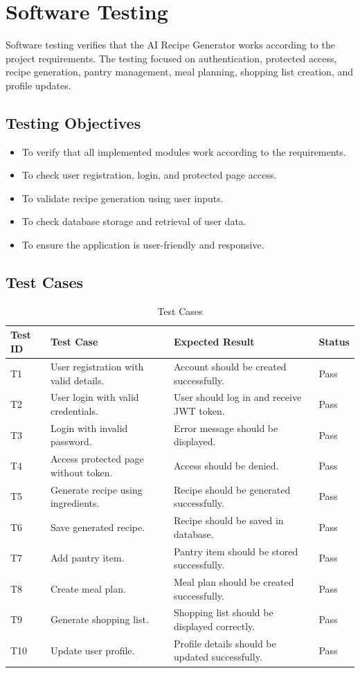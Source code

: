 \section{Software Testing}

Software testing verifies that the AI Recipe Generator works according to the project requirements. The testing focused on authentication, protected access, recipe generation, pantry management, meal planning, shopping list creation, and profile updates.

\subsection{Testing Objectives}
\begin{itemize}
\item To verify that all implemented modules work according to the requirements.
\item To check user registration, login, and protected page access.
\item To validate recipe generation using user inputs.
\item To check database storage and retrieval of user data.
\item To ensure the application is user-friendly and responsive.
\end{itemize}

\subsection{Test Cases}
\begin{table}[h]
\centering
\caption{Test Cases}
\begin{tabularx}{\textwidth}{|p{1.5cm}|X|X|p{2cm}|}
\hline
\textbf{Test ID} & \textbf{Test Case} & \textbf{Expected Result} & \textbf{Status} \\
\hline
T1 & User registration with valid details. & Account should be created successfully. & Pass \\
\hline
T2 & User login with valid credentials. & User should log in and receive JWT token. & Pass \\
\hline
T3 & Login with invalid password. & Error message should be displayed. & Pass \\
\hline
T4 & Access protected page without token. & Access should be denied. & Pass \\
\hline
T5 & Generate recipe using ingredients. & Recipe should be generated successfully. & Pass \\
\hline
T6 & Save generated recipe. & Recipe should be saved in database. & Pass \\
\hline
T7 & Add pantry item. & Pantry item should be stored successfully. & Pass \\
\hline
T8 & Create meal plan. & Meal plan should be created successfully. & Pass \\
\hline
T9 & Generate shopping list. & Shopping list should be displayed correctly. & Pass \\
\hline
T10 & Update user profile. & Profile details should be updated successfully. & Pass \\
\hline
\end{tabularx}
\end{table}

\FloatBarrier

